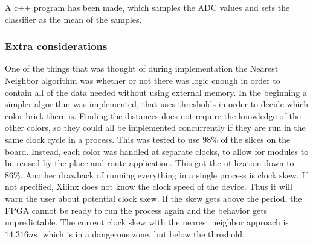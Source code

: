 A c++ program has been made, which samples the ADC values and sets the classifier as the mean of the samples.

\subsubsection{Extra considerations}
One of the things that was thought of during implementation the Nearest Neighbor algorithm was whether or not there was logic enough in order to contain all of the data needed without using external memory. In the beginning a simpler algorithm was implemented, that uses thresholds in order to decide which color brick there is.
Finding the distances does not require the knowledge of the other colors, so they could all be implemented concurrently if they are run in the same clock cycle in a process.
This was tested to use 98\% of the slices on the board.
Instead, each color was handled at separate clocks, to allow for modules to be reused by the place and route application.
This got the utilization down to 86\%.
Another drawback of running everything in a single process is clock skew.
If not specified, Xilinx does not know the clock speed of the device.
Thus it will warn the user about potential clock skew.
If the skew gets above the period, the FPGA cannot be ready to run the process again and the behavior gets unpredictable.
The current clock skew with the nearest neighbor approach is $14.316 ns$, which is in a dangerous zone, but below the threshold. 

